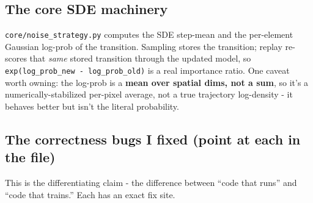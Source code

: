 \documentclass[11pt]{article}
\newcommand{\code}[1]{\texttt{\small #1}}
\begin{document}
\subsection{The core SDE machinery}
\code{core/noise\_strategy.py} computes the SDE step-mean and the per-element Gaussian
log-prob of the transition. Sampling stores the transition; replay re-scores that
\textit{same} stored transition through the updated model, so
\code{exp(log\_prob\_new - log\_prob\_old)} is a real importance ratio. One caveat worth
owning: the log-prob is a \textbf{mean over spatial dims, not a sum}, so it's a
numerically-stabilized per-pixel average, not a true trajectory log-density - it behaves
better but isn't the literal probability.

\subsection{The correctness bugs I fixed (point at each in the file)}
This is the differentiating claim - the difference between ``code that runs'' and
``code that trains.'' Each has an exact fix site.
\end{document}

